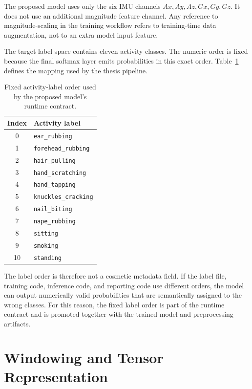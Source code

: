 The proposed model uses only the six IMU channels \(Ax, Ay, Az, Gx, Gy, Gz\). It does not use an additional magnitude feature channel. Any reference to magnitude-scaling in the training workflow refers to training-time data augmentation, not to an extra model input feature.

The target label space contains eleven activity classes. The numeric order is fixed because the final softmax layer emits probabilities in this exact order. Table~\ref{tab:label_order} defines the mapping used by the thesis pipeline.

\renewcommand{\arraystretch}{1.2}
\begin{table}[htbp]
\centering
\footnotesize
\caption[Fixed activity-label order used by the proposed model's runtime contract.]{Fixed activity-label order used by the proposed model's runtime contract.}
\label{tab:label_order}
\begin{tabular}{cl}
\toprule
\textbf{Index} & \textbf{Activity label} \\
\midrule
0  & \texttt{ear\_rubbing} \\
1  & \texttt{forehead\_rubbing} \\
2  & \texttt{hair\_pulling} \\
3  & \texttt{hand\_scratching} \\
4  & \texttt{hand\_tapping} \\
5  & \texttt{knuckles\_cracking} \\
6  & \texttt{nail\_biting} \\
7  & \texttt{nape\_rubbing} \\
8  & \texttt{sitting} \\
9  & \texttt{smoking} \\
10 & \texttt{standing} \\
\bottomrule
\end{tabular}
\renewcommand{\arraystretch}{1.0}
\end{table}

The label order is therefore not a cosmetic metadata field. If the label file, training code, inference code, and reporting code use different orders, the model can output numerically valid probabilities that are semantically assigned to the wrong classes. For this reason, the fixed label order is part of the runtime contract and is promoted together with the trained model and preprocessing artifacts.

\section{Windowing and Tensor Representation}
\label{sec:windowing_tensor_representation}

